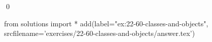 
\begin{ex}
  \label{ex:22-60-classes-and-objects}
  
  \qed
\end{ex}
\begin{python0}
from solutions import *
add(label="ex:22-60-classes-and-objects",
    srcfilename='exercises/22-60-classes-and-objects/answer.tex')
\end{python0}
